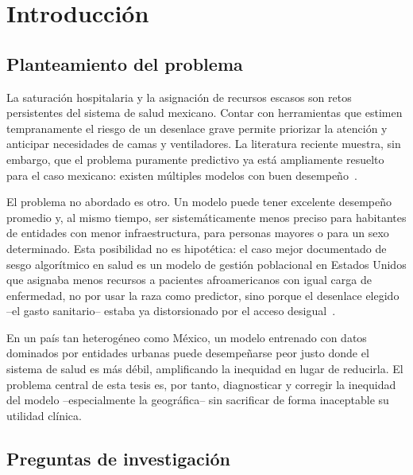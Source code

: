 \chapter{Introducción}
\label{cap:introduccion}

\section{Planteamiento del problema}

La saturación hospitalaria y la asignación de recursos escasos son retos
persistentes del sistema de salud mexicano. Contar con herramientas que estimen
tempranamente el riesgo de un desenlace grave permite priorizar la atención y
anticipar necesidades de camas y ventiladores. La literatura reciente muestra,
sin embargo, que el problema puramente predictivo ya está ampliamente resuelto
para el caso mexicano: existen múltiples modelos con buen
desempeño~\parencite{becerra2022,mendez2024}.

El problema no abordado es otro. Un modelo puede tener excelente desempeño
promedio y, al mismo tiempo, ser sistemáticamente menos preciso para habitantes
de entidades con menor infraestructura, para personas mayores o para un sexo
determinado. Esta posibilidad no es hipotética: el caso mejor documentado de
sesgo algorítmico en salud es un modelo de gestión poblacional en Estados Unidos
que asignaba menos recursos a pacientes afroamericanos con igual carga de
enfermedad, no por usar la raza como predictor, sino porque el desenlace elegido
--el gasto sanitario-- estaba ya distorsionado por el acceso
desigual~\parencite{obermeyer2019}.

En un país tan heterogéneo como México, un modelo entrenado con datos dominados
por entidades urbanas puede desempeñarse peor justo donde el sistema de salud es
más débil, amplificando la inequidad en lugar de reducirla. El problema central
de esta tesis es, por tanto, diagnosticar y corregir la inequidad del modelo
--especialmente la geográfica-- sin sacrificar de forma inaceptable su utilidad
clínica.

\section{Preguntas de investigación}

